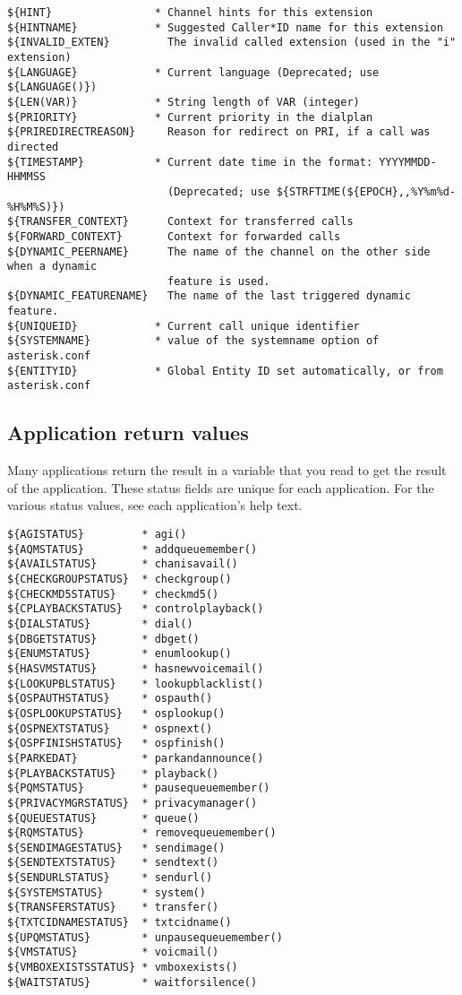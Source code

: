 \begin{verbatim}
${HINT}                * Channel hints for this extension
${HINTNAME}            * Suggested Caller*ID name for this extension
${INVALID_EXTEN}         The invalid called extension (used in the "i" extension)
${LANGUAGE}            * Current language (Deprecated; use ${LANGUAGE()})
${LEN(VAR)}            * String length of VAR (integer)
${PRIORITY}            * Current priority in the dialplan
${PRIREDIRECTREASON}     Reason for redirect on PRI, if a call was directed
${TIMESTAMP}           * Current date time in the format: YYYYMMDD-HHMMSS
                         (Deprecated; use ${STRFTIME(${EPOCH},,%Y%m%d-%H%M%S)})
${TRANSFER_CONTEXT}      Context for transferred calls
${FORWARD_CONTEXT}       Context for forwarded calls
${DYNAMIC_PEERNAME}      The name of the channel on the other side when a dynamic
                         feature is used.
${DYNAMIC_FEATURENAME}   The name of the last triggered dynamic feature.
${UNIQUEID}            * Current call unique identifier
${SYSTEMNAME}          * value of the systemname option of asterisk.conf
${ENTITYID}            * Global Entity ID set automatically, or from asterisk.conf
\end{verbatim}

\subsection{Application return values}

Many applications return the result in a variable that you read to
get the result of the application. These status fields are unique
for each application.
For the various status values, see each application's help text.
\begin{verbatim}
${AGISTATUS}         * agi()
${AQMSTATUS}         * addqueuemember()
${AVAILSTATUS}       * chanisavail()
${CHECKGROUPSTATUS}  * checkgroup()
${CHECKMD5STATUS}    * checkmd5()
${CPLAYBACKSTATUS}   * controlplayback()
${DIALSTATUS}        * dial()
${DBGETSTATUS}       * dbget()
${ENUMSTATUS}        * enumlookup()
${HASVMSTATUS}       * hasnewvoicemail()
${LOOKUPBLSTATUS}    * lookupblacklist()
${OSPAUTHSTATUS}     * ospauth()
${OSPLOOKUPSTATUS}   * osplookup()
${OSPNEXTSTATUS}     * ospnext()
${OSPFINISHSTATUS}   * ospfinish()
${PARKEDAT}          * parkandannounce()
${PLAYBACKSTATUS}    * playback()
${PQMSTATUS}         * pausequeuemember()
${PRIVACYMGRSTATUS}  * privacymanager()
${QUEUESTATUS}       * queue()
${RQMSTATUS}         * removequeuemember()
${SENDIMAGESTATUS}   * sendimage()
${SENDTEXTSTATUS}    * sendtext()
${SENDURLSTATUS}     * sendurl()
${SYSTEMSTATUS}      * system()
${TRANSFERSTATUS}    * transfer()
${TXTCIDNAMESTATUS}  * txtcidname()
${UPQMSTATUS}        * unpausequeuemember()
${VMSTATUS}          * voicmail()
${VMBOXEXISTSSTATUS} * vmboxexists()
${WAITSTATUS}        * waitforsilence()
\end{verbatim}

